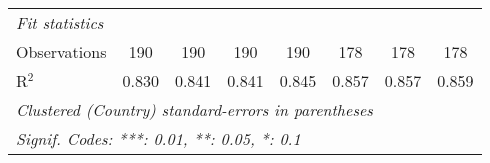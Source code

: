 \begin{tabular}{lccccccc}
   \midrule \emph{Fit statistics}\\
   Observations                                                                      & 190          & 190          & 190          & 190         & 178           & 178           & 178\\  
   R$^2$                                                                             & 0.830        & 0.841        & 0.841        & 0.845       & 0.857         & 0.857         & 0.859\\  
   \midrule
   \multicolumn{8}{l}{\emph{Clustered (Country) standard-errors in parentheses}}\\
   \multicolumn{8}{l}{\emph{Signif. Codes: ***: 0.01, **: 0.05, *: 0.1}}\\
\end{tabular}
\par\endgroup


